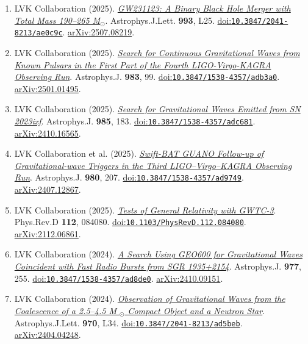 \documentclass[11pt]{article}
\begin{document}
\begin{enumerate}
\item LVK Collaboration (2025). \href{https://arxiv.org/abs/2507.08219}{\textit{GW231123: A Binary Black Hole Merger with Total Mass 190--265 M$_{\odot}$}}. Astrophys.J.Lett. \textbf{993}, L25. \href{https://doi.org/10.3847/2041-8213/ae0c9c}{doi:\nolinkurl{10.3847/2041-8213/ae0c9c}}. \href{https://arxiv.org/abs/2507.08219}{arXiv:2507.08219}.
\item LVK Collaboration (2025). \href{https://arxiv.org/abs/2501.01495}{\textit{Search for Continuous Gravitational Waves from Known Pulsars in the First Part of the Fourth LIGO-Virgo-KAGRA Observing Run}}. Astrophys.J. \textbf{983}, 99. \href{https://doi.org/10.3847/1538-4357/adb3a0}{doi:\nolinkurl{10.3847/1538-4357/adb3a0}}. \href{https://arxiv.org/abs/2501.01495}{arXiv:2501.01495}.
\item LVK Collaboration (2025). \href{https://arxiv.org/abs/2410.16565}{\textit{Search for Gravitational Waves Emitted from SN 2023ixf}}. Astrophys.J. \textbf{985}, 183. \href{https://doi.org/10.3847/1538-4357/adc681}{doi:\nolinkurl{10.3847/1538-4357/adc681}}. \href{https://arxiv.org/abs/2410.16565}{arXiv:2410.16565}.
\item LVK Collaboration et al. (2025). \href{https://arxiv.org/abs/2407.12867}{\textit{Swift-BAT GUANO Follow-up of Gravitational-wave Triggers in the Third LIGO--Virgo--KAGRA Observing Run}}. Astrophys.J. \textbf{980}, 207. \href{https://doi.org/10.3847/1538-4357/ad9749}{doi:\nolinkurl{10.3847/1538-4357/ad9749}}. \href{https://arxiv.org/abs/2407.12867}{arXiv:2407.12867}.
\item LVK Collaboration (2025). \href{https://arxiv.org/abs/2112.06861}{\textit{Tests of General Relativity with GWTC-3}}. Phys.Rev.D \textbf{112}, 084080. \href{https://doi.org/10.1103/PhysRevD.112.084080}{doi:\nolinkurl{10.1103/PhysRevD.112.084080}}. \href{https://arxiv.org/abs/2112.06861}{arXiv:2112.06861}.
\item LVK Collaboration (2024). \href{https://arxiv.org/abs/2410.09151}{\textit{A Search Using GEO600 for Gravitational Waves Coincident with Fast Radio Bursts from SGR 1935+2154}}. Astrophys.J. \textbf{977}, 255. \href{https://doi.org/10.3847/1538-4357/ad8de0}{doi:\nolinkurl{10.3847/1538-4357/ad8de0}}. \href{https://arxiv.org/abs/2410.09151}{arXiv:2410.09151}.
\item LVK Collaboration (2024). \href{https://arxiv.org/abs/2404.04248}{\textit{Observation of Gravitational Waves from the Coalescence of a 2.5--4.5 M $_{\odot}$ Compact Object and a Neutron Star}}. Astrophys.J.Lett. \textbf{970}, L34. \href{https://doi.org/10.3847/2041-8213/ad5beb}{doi:\nolinkurl{10.3847/2041-8213/ad5beb}}. \href{https://arxiv.org/abs/2404.04248}{arXiv:2404.04248}.

\end{enumerate}
\end{document}

